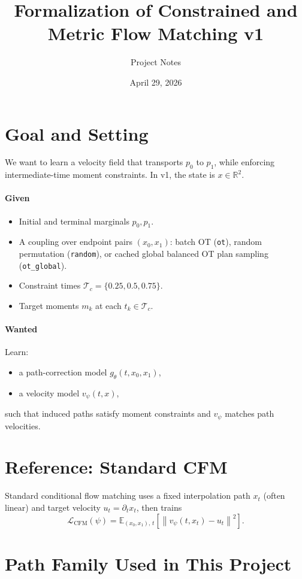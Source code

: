 \documentclass[11pt]{article}
\title{Formalization of Constrained and Metric Flow Matching v1}
\author{Project Notes}
\date{April 29, 2026}
\begin{document}
\maketitle

\section{Goal and Setting}
We want to learn a velocity field that transports $p_0$ to $p_1$, while enforcing intermediate-time moment constraints.
In v1, the state is $x \in \mathbb{R}^2$.

\paragraph{Given}
\begin{itemize}
    \item Initial and terminal marginals $p_0, p_1$.
    \item A coupling over endpoint pairs $(x_0, x_1)$:
    batch OT (\texttt{ot}), random permutation (\texttt{random}), or cached global balanced OT plan sampling (\texttt{ot\_global}).
    \item Constraint times $\mathcal{T}_c = \{0.25, 0.5, 0.75\}$.
    \item Target moments $m_k$ at each $t_k \in \mathcal{T}_c$.
\end{itemize}

\paragraph{Wanted}
Learn:
\begin{itemize}
    \item a path-correction model $g_\theta(t,x_0,x_1)$,
    \item a velocity model $v_\psi(t,x)$,
\end{itemize}
such that induced paths satisfy moment constraints and $v_\psi$ matches path velocities.

\section{Reference: Standard CFM}
Standard conditional flow matching uses a fixed interpolation path $x_t$ (often linear) and target velocity $u_t = \partial_t x_t$, then trains
\[
\mathcal{L}_{\mathrm{CFM}}(\psi)
=
\mathbb{E}_{(x_0,x_1),\,t}
\left[
\left\|
v_\psi(t,x_t) - u_t
\right\|^2
\right].
\]

\section{Path Family Used in This Project}
\end{document}
